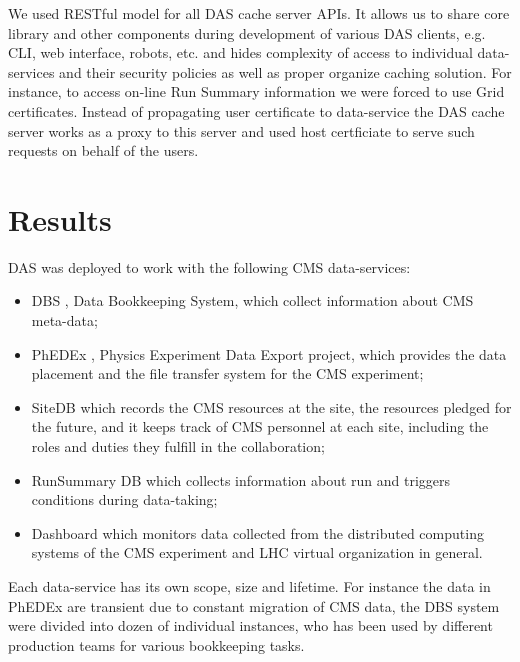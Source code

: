 \documentclass[a4paper]{jpconf}
\begin{document}
We used RESTful model \cite{REST} for all DAS cache server APIs.
It allows us to share core library and other components during development of 
various DAS clients, e.g. CLI, web interface, robots, etc. and hides
complexity of access to individual data-services and their security policies
as well as proper organize caching solution.
For instance, to access on-line Run Summary information we were forced to use
Grid certificates. Instead of propagating user certificate to data-service
the DAS cache server works as a proxy to this server and used host certficiate 
to serve such requests on behalf of the users.

\section{Results\label{Results}}
DAS was deployed to work with the following CMS data-services:
\begin{itemize}
\item DBS \cite{DBS}, Data Bookkeeping System, which collect information
about CMS meta-data;
\item PhEDEx \cite{PhEDEx}, Physics Experiment Data Export project, which
provides the data placement and the file transfer system for the CMS experiment;
\item SiteDB \cite{SiteDB} which 
records the CMS resources at the site, the resources pledged for the 
future, and it keeps track of CMS personnel at each site, including the 
roles and duties they fulfill in the collaboration;
\item RunSummary DB \cite{RunSummary} which collects information about run and triggers
conditions during data-taking;
\item Dashboard \cite{Dashboard} which monitors data collected from the 
distributed computing systems of the CMS experiment and LHC virtual organization
in general.
\end{itemize}
Each data-service has its own scope, size and lifetime. For instance the data
in PhEDEx are transient due to constant migration of CMS data, 
the DBS system were divided into dozen of individual instances, 
who has been used by different production teams for various bookkeeping tasks.
\end{document}
